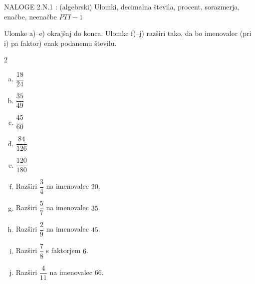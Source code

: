 \documentclass[a4paper,12pt]{letter}
\renewcommand{\headrulewidth}{3pt}
\renewcommand{\headrulewidth}{0.3pt}
\begin{document}
\pagestyle{fancy}
\renewcommand\headrulewidth{0pt}
\lhead{}\chead{}\rhead{}
\rfoot{\vspace*{-2\baselineskip}}
\renewcommand{\vec}{\overrightarrow}
\everymath{\displaystyle}

\begin{minipage}{20cm}
\begin{bclogo}[couleur=brown!40,
  arrondi=0,ombre=true, couleurOmbre=gray!50,
logo =\bcplume,
  noborder=true]
{\textrm{{\Large{NALOGE 2.N.1} \Huge{}:
\large{(algebrski) Ulomki, decimalna števila, procent, sorazmerja, enačbe, neenačbe} \hfill $PTI-1$}}}
\end{bclogo}
\end{minipage}
\begin{minipage}{20cm}
\end{minipage}




\begin{naloga}
Ulomke a)--e) okraj\v{s}aj do konca. Ulomke f)--j) raz\v{s}iri tako, da bo imenovalec
(pri i) pa faktor) enak podanemu \v{s}tevilu.

\begin{multicols}{2}
\begin{enumerate}[a.)]
\item $\dfrac{18}{24}$
\item $\dfrac{35}{49}$
\item $\dfrac{45}{60}$
\item $\dfrac{84}{126}$
\item $\dfrac{120}{180}$
\item Raz\v{s}iri $\dfrac{3}{4}$ na imenovalec $20$.
\item Raz\v{s}iri $\dfrac{5}{7}$ na imenovalec $35$.
\item Raz\v{s}iri $\dfrac{2}{9}$ na imenovalec $45$.
\item Raz\v{s}iri $\dfrac{7}{8}$ s faktorjem $6$.
\item Raz\v{s}iri $\dfrac{4}{11}$ na imenovalec $66$.
\end{enumerate}
\end{multicols}
\end{naloga}
\end{document}
